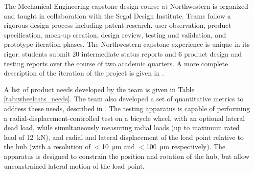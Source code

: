 \documentclass[\rootdir/thesis.tex]{subfiles}
\begin{document}
The Mechanical Engineering capstone design course at Northwestern is organized and taught in collaboration with the Segal Design Institute. Teams follow a rigorous design process including patent research, user observation, product specification, mock-up creation, design review, testing and validation, and prototype iteration phases. The Northwestern capstone experience is unique in its rigor: students submit 20 intermediate status reports and 6 product design and testing reports over the course of two academic quarters. A more complete description of the iteration of the project is given in \cite{WheelCats2018}.

A list of product needs developed by the team is given in Table \ref{tab:wheelcats_needs}. The team also developed a set of quantitative metrics to address these needs, described in \cite{WheelCats2018}. The testing apparatus is capable of performing a radial-displacement-controlled test on a bicycle wheel, with an optional lateral dead load, while simultaneously measuring radial loads (up to maximum rated load of \SI{12}{\kilo\newton}), and radial and lateral displacement of the load point relative to the hub (with a resolution of $<$\SI{10}{\micro\meter} and $<$\SI{100}{\micro\meter} respectively). The apparatus is designed to constrain the position and rotation of the hub, but allow unconstrained lateral motion of the load point.
\end{document}
